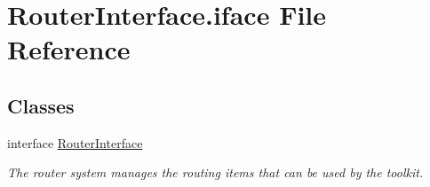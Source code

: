 \hypertarget{RouterInterface_8iface}{\section{Router\-Interface.\-iface File Reference}
\label{RouterInterface_8iface}
}
\subsection*{Classes}
\begin{DoxyCompactItemize}
\item 
interface \hyperlink{interfaceRouterInterface}{Router\-Interface}
\begin{DoxyCompactList}\small\item\em The router system manages the routing items that can be used by the toolkit. \end{DoxyCompactList}\end{DoxyCompactItemize}
